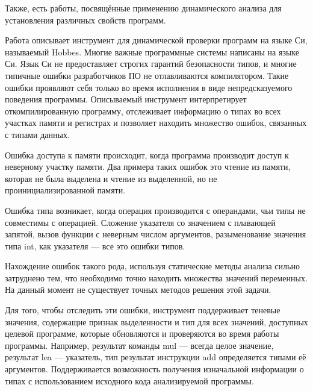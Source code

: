 \documentclass[a4paper,12pt,russian]{article}
\newcommand{\code}[1]{\textsf{#1}}
\begin{document}
Также, есть работы, посвящённые применению динамического анализа для установления различных свойств программ.

Работа \cite{typechecking} описывает инструмент для динамической проверки программ на языке Си, называемый \code{Hobbes}.
Многие важные программные системы написаны на языке Си.
Язык Си не предоставляет строгих гарантий безопасности типов, и многие типичные ошибки разработчиков ПО не отлавливаются компилятором. Такие ошибки проявляют себя только во время исполнения в виде непредсказуемого поведения программы.
Описываемый инструмент интерпретирует откомпилированную программу, отслеживает информацию о типах во всех участках памяти и регистрах и позволяет находить множество ошибок, связанных с типами данных.

Ошибка доступа к памяти происходит, когда программа производит доступ к неверному участку памяти.
Два примера таких ошибок это чтение из памяти, которая не была выделена и чтение из выделенной, но не проинициализированной памяти.

Ошибка типа возникает, когда операция производится с операндами, чьи типы не совместимы с операцией.
Сложение указателя со значением с плавающей запятой, вызов функции с неверным числом аргументов, разыменование значения типа \code{int}, как указателя --- все это ошибки типов.

Нахождение ошибок такого рода, используя статические методы анализа сильно затруднено тем, что необходимо точно находить множества значений переменных.
На данный момент не существует точных методов решения этой задачи.

Для того, чтобы отследить эти ошибки, инструмент поддерживает теневые значения, содержащие признак выделенности и тип для всех значений, доступных целевой программе, которые обновляются и проверяются во время работы программы.
Например, результат команды \code{mul} --- всегда целое значение, результат \code{lea} --- указатель, тип результат инструкции \code{add} определяется типами её аргументов.
Поддерживается возможность получения изначальной информации о типах с использованием исходного кода анализируемой программы.
\end{document}
